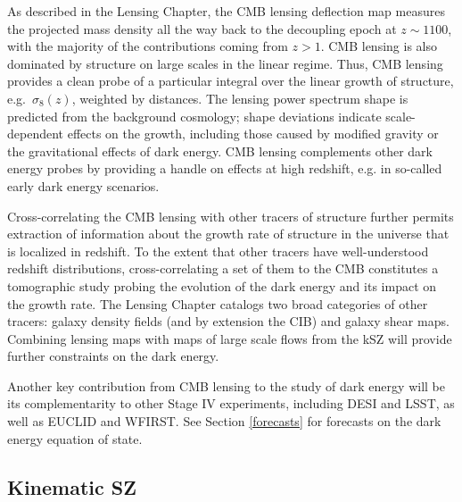 As described in the Lensing Chapter, the CMB lensing deflection map measures the projected mass density all the way back to the decoupling epoch at $z \sim 1100$, with the majority of the contributions coming from $z > 1$.  CMB lensing is also dominated by structure on large scales in the linear regime.  Thus,  CMB lensing provides a clean probe of a particular integral over the linear growth of structure,
e.g.~$\sigma_8(z)$,
weighted by distances. The lensing power spectrum shape is predicted from the background cosmology; shape deviations indicate scale-dependent effects on the growth, including those caused by modified gravity or the 
gravitational effects of dark energy.  CMB lensing complements other dark energy probes by providing
a handle on effects at high redshift, e.g. in so-called early dark energy scenarios.

Cross-correlating the CMB lensing with other tracers of structure further permits extraction of information about the growth rate of structure in the universe that is localized in redshift.  To the extent that other tracers have well-understood redshift distributions, cross-correlating a set of them to the CMB constitutes a tomographic study probing the evolution of the dark energy and its impact on the growth rate. The Lensing Chapter catalogs two broad categories of other tracers: galaxy density fields (and by extension the CIB) and galaxy shear maps. Combining lensing maps with maps of large scale flows from the kSZ will provide further constraints on the dark energy.

Another key contribution from CMB lensing to the study of dark energy will be its complementarity to other Stage IV experiments, including DESI and LSST, as well as EUCLID and WFIRST. 
See Section \ref{forecasts} for forecasts on the dark energy equation of state.






\subsection{Kinematic SZ}

